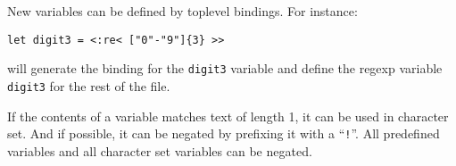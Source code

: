 \documentclass{article}
\begin{document}
New variables can be defined by toplevel bindings. For instance:

\begin{verbatim}
let digit3 = <:re< ["0"-"9"]{3} >>
\end{verbatim}

will generate the binding for the \texttt{digit3} variable and define
the regexp variable \texttt{digit3} for the rest of the file.

If the contents of a variable matches text of length 1, it can be used
in character set. And if possible, it can be negated by prefixing it
with a ``\texttt{!}''. All predefined variables and all character set
variables can be negated.
\end{document}
